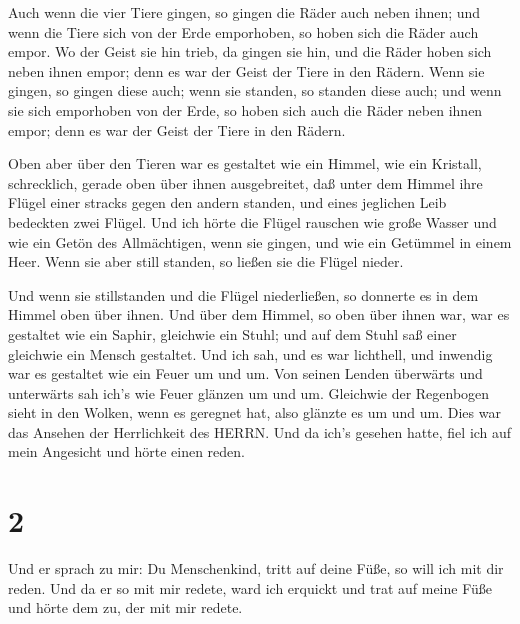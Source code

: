  Auch wenn die vier Tiere gingen, so gingen die Räder auch
neben ihnen; und wenn die Tiere sich von der Erde emporhoben, so hoben
sich die Räder auch empor.  Wo der Geist sie hin trieb, da
gingen sie hin, und die Räder hoben sich neben ihnen empor; denn es war
der Geist der Tiere in den Rädern.  Wenn sie gingen, so
gingen diese auch; wenn sie standen, so standen diese auch; und wenn sie
sich emporhoben von der Erde, so hoben sich auch die Räder neben ihnen
empor; denn es war der Geist der Tiere in den Rädern.

 Oben aber über den Tieren war es gestaltet wie ein Himmel,
wie ein Kristall, schrecklich, gerade oben über ihnen ausgebreitet,
 daß unter dem Himmel ihre Flügel einer stracks gegen den
andern standen, und eines jeglichen Leib bedeckten zwei Flügel.
 Und ich hörte die Flügel rauschen wie große Wasser und wie
ein Getön des Allmächtigen, wenn sie gingen, und wie ein Getümmel in
einem Heer. Wenn sie aber still standen, so ließen sie die Flügel
nieder.

 Und wenn sie stillstanden und die Flügel niederließen, so
donnerte es in dem Himmel oben über ihnen.  Und über dem
Himmel, so oben über ihnen war, war es gestaltet wie ein Saphir,
gleichwie ein Stuhl; und auf dem Stuhl saß einer gleichwie ein Mensch
gestaltet.  Und ich sah, und es war lichthell, und inwendig
war es gestaltet wie ein Feuer um und um. Von seinen Lenden überwärts
und unterwärts sah ich's wie Feuer glänzen um und um. 
Gleichwie der Regenbogen sieht in den Wolken, wenn es geregnet hat, also
glänzte es um und um. Dies war das Ansehen der Herrlichkeit des HERRN.
Und da ich's gesehen hatte, fiel ich auf mein Angesicht und hörte einen
reden.

\hypertarget{section-1}{%
\section{2}\label{section-1}}

 Und er sprach zu mir: Du Menschenkind, tritt auf deine
Füße, so will ich mit dir reden.  Und da er so mit mir
redete, ward ich erquickt und trat auf meine Füße und hörte dem zu, der
mit mir redete.

